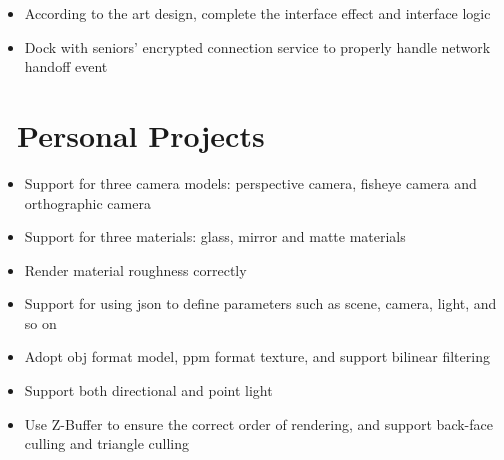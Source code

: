 \documentclass{resume}
\begin{document}
\begin{itemize}
  \item According to the art design, complete the interface effect and interface logic
  \item Dock with seniors' encrypted connection service to properly handle network handoff event
\end{itemize}


\section{\texorpdfstring{\faGithubAlt\ Personal Projects}{Personal Projects}}
\begin{itemize}
  \item Support for three camera models: perspective camera, fisheye camera and orthographic camera
  \item Support for three materials: glass, mirror and matte materials
  \item Render material roughness correctly
\end{itemize}

\begin{itemize}
  \item Support for using json to define parameters such as scene, camera, light, and so on
  \item Adopt obj format model, ppm format texture, and support bilinear filtering
  \item Support both directional and point light
  \item Use Z-Buffer to ensure the correct order of rendering, and support back-face culling and triangle culling
\end{itemize}
\end{document}
